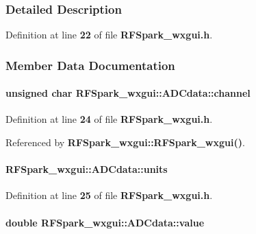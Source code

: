 \subsubsection{Detailed Description}


Definition at line {\bf 22} of file {\bf R\+F\+Spark\+\_\+wxgui.\+h}.



\subsubsection{Member Data Documentation}
\paragraph[{channel}]{\setlength{\rightskip}{0pt plus 5cm}unsigned char R\+F\+Spark\+\_\+wxgui\+::\+A\+D\+Cdata\+::channel}\label{structRFSpark__wxgui_1_1ADCdata_a3983003f4bbc31a5af334220b5aae202}


Definition at line {\bf 24} of file {\bf R\+F\+Spark\+\_\+wxgui.\+h}.



Referenced by {\bf R\+F\+Spark\+\_\+wxgui\+::\+R\+F\+Spark\+\_\+wxgui()}.

\paragraph[{units}]{ R\+F\+Spark\+\_\+wxgui\+::\+A\+D\+Cdata\+::units}\label{structRFSpark__wxgui_1_1ADCdata_a52da8d683ccea826d5b790dbfd4e95b2}


Definition at line {\bf 25} of file {\bf R\+F\+Spark\+\_\+wxgui.\+h}.

\paragraph[{value}]{\setlength{\rightskip}{0pt plus 5cm}double R\+F\+Spark\+\_\+wxgui\+::\+A\+D\+Cdata\+::value}\label{structRFSpark__wxgui_1_1ADCdata_a2c685408d5ed6b4d6a966bed0ec3e393}


